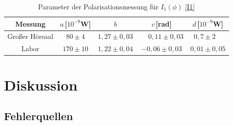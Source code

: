 \documentclass[titlepage,11pt,a4paper,ngerman]{article}
\begin{document}
%

\begin{table}[ht]
	\centering
	\caption{Parameter der Polarisationsmessung für $I_1(\phi)$ \eqref{I1}}
	\begin{tabular*}{.95\textwidth}{@{\extracolsep{\fill}}ccccc}
		\toprule
		Messung & $a\,$[$ 10^{-9} $W] & $b$ & $ c\, $[rad] & $ d\,$[$ 10^{-9} $W]\\
		\midrule
		Großer Hörsaal & $ 80 \pm 4 $ & $ 1{,}27 \pm 0{,}03 $ & $ \phantom{-}0{,}11 \pm 0{,}03 $ & $ 0{,}7 \pm 2 \phantom{0,}$\\
		Labor & $ 170 \pm 10 $ & $ 1{,}22 \pm 0{,}04 $ & $ -0{,}06 \pm 0{,}03 $ & $ 0{,}01 \pm 0{,}05 $ \\
		\bottomrule
	\end{tabular*}
	\label{tab2}
\end{table}

\section{Diskussion}

\subsection{Fehlerquellen}
\end{document}
